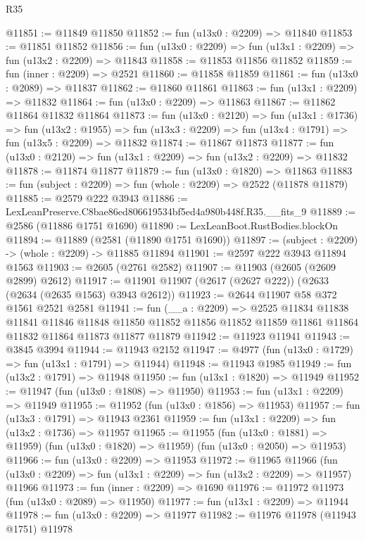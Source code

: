\begin{lexlean}{R35}
\begin{coremodule}
@11851 := @11849 @11850
@11852 := fun (u13x0 : @2209) => @11840
@11853 := @11851 @11852
@11856 := fun (u13x0 : @2209) => fun (u13x1 : @2209) => fun (u13x2 : @2209) => @11843
@11858 := @11853 @11856 @11852
@11859 := fun (inner : @2209) => @2521
@11860 := @11858 @11859
@11861 := fun (u13x0 : @2089) => @11837
@11862 := @11860 @11861
@11863 := fun (u13x1 : @2209) => @11832
@11864 := fun (u13x0 : @2209) => @11863
@11867 := @11862 @11864 @11832 @11864
@11873 := fun (u13x0 : @2120) =>
  fun (u13x1 : @1736) =>
  fun (u13x2 : @1955) => fun (u13x3 : @2209) => fun (u13x4 : @1791) => fun (u13x5 : @2209) => @11832
@11874 := @11867 @11873
@11877 := fun (u13x0 : @2120) => fun (u13x1 : @2209) => fun (u13x2 : @2209) => @11832
@11878 := @11874 @11877
@11879 := fun (u13x0 : @1820) => @11863
@11883 := fun (subject : @2209) => fun (whole : @2209) => @2522 (@11878 @11879)
@11885 := @2579 @222 @3943
@11886 := LexLeanPreserve.C8bae86ed806619534bf5ed4a980b448f.R35.__fits_9
@11889 := @2586 (@11886 @1751 @1690)
@11890 := LexLeanBoot.RustBodies.blockOn
@11894 := @11889 (@2581 (@11890 @1751 @1690))
@11897 := (subject : @2209) -> (whole : @2209) -> @11885 @11894
@11901 := @2597 @222 @3943 @11894 @1563
@11903 := @2605 (@2761 @2582)
@11907 := @11903 (@2605 (@2609 @2899) @2612)
@11917 := @11901 @11907 (@2617 (@2627 @222)) (@2633 (@2634 (@2635 @1563) @3943 @2612))
@11923 := @2644 @11907 @58 @372 @1561 @2521 @2581
@11941 := fun (__a : @2209) =>
  @2525
    @11834
    @11838
    @11841
    @11846
    @11848
    @11850
    @11852
    @11856
    @11852
    @11859
    @11861
    @11864
    @11832
    @11864
    @11873
    @11877
    @11879
@11942 := @11923 @11941
@11943 := @3845 @3994
@11944 := @11943 @2152
@11947 := @4977 (fun (u13x0 : @1729) => fun (u13x1 : @1791) => @11944)
@11948 := @11943 @1985
@11949 := fun (u13x2 : @1791) => @11948
@11950 := fun (u13x1 : @1820) => @11949
@11952 := @11947 (fun (u13x0 : @1808) => @11950)
@11953 := fun (u13x1 : @2209) => @11949
@11955 := @11952 (fun (u13x0 : @1856) => @11953)
@11957 := fun (u13x3 : @1791) => @11943 @2361
@11959 := fun (u13x1 : @2209) => fun (u13x2 : @1736) => @11957
@11965 := @11955
    (fun (u13x0 : @1881) => @11959)
    (fun (u13x0 : @1820) => @11959)
    (fun (u13x0 : @2050) => @11953)
@11966 := fun (u13x0 : @2209) => @11953
@11972 := @11965
    @11966
    (fun (u13x0 : @2209) => fun (u13x1 : @2209) => fun (u13x2 : @2209) => @11957)
    @11966
@11973 := fun (inner : @2209) => @1690
@11976 := @11972 @11973 (fun (u13x0 : @2089) => @11950)
@11977 := fun (u13x1 : @2209) => @11944
@11978 := fun (u13x0 : @2209) => @11977
@11982 := @11976 @11978 (@11943 @1751) @11978

\end{coremodule}
\end{lexlean}
